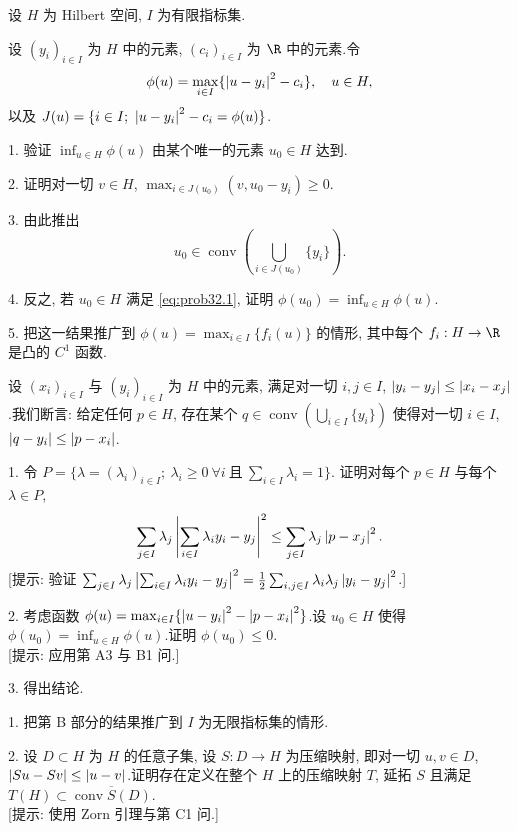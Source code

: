\begin{problem}
\label{prob:32}
设 $H$ 为 Hilbert 空间, $I$ 为有限指标集.


设 $(y_i)_{i\in I}$ 为 $H$ 中的元素, $(c_i)_{i\in I}$ 为 $\R$ 中的元素.令
\begin{equation*}
\phi(u)=\max_{i\in I}\{\left|u-y_i\right|^2-c_i\},\quad u\in H,
\end{equation*}
以及 $J(u)=\{i\in I;\ \abs{u-y_i}^2-c_i=\phi(u)\}$.

1. 验证 $\inf_{u\in H}\phi(u)$ 由某个唯一的元素 $u_0\in H$ 达到.

2. 证明对一切 $v\in H$, $\max_{i\in J(u_0)}(v,u_0-y_i)\ge0$.

3. 由此推出
\begin{equation}
u_0\in\operatorname{conv}\left(\bigcup_{i\in J(u_0)}\{y_i\}\right).
\label{eq:prob32.1}
\end{equation}

4. 反之, 若 $u_0\in H$ 满足 \eqref{eq:prob32.1}, 证明 $\phi(u_0)=\inf_{u\in H}\phi(u)$.

5. 把这一结果推广到 $\phi(u)=\max_{i\in I}\{f_i(u)\}$ 的情形, 其中每个 $f_i:H\to\R$
是凸的 $C^1$ 函数.


设 $(x_i)_{i\in I}$ 与 $(y_i)_{i\in I}$ 为 $H$ 中的元素, 满足对一切 $i,j\in I$,
$\left|y_i-y_j\right|\le\left|x_i-x_j\right|$.我们断言: 给定任何 $p\in H$, 存在某个
$q\in\operatorname{conv}\left(\bigcup_{i\in I}\{y_i\}\right)$ 使得对一切 $i\in I$,
$\left|q-y_i\right|\le\left|p-x_i\right|$.

1. 令 $P=\{\lambda=(\lambda_i)_{i\in I};\ \lambda_i\ge0\ \forall i\ \text{且}\ \sum_{i\in I}\lambda_i=1\}$.
证明对每个 $p\in H$ 与每个 $\lambda\in P$,
\begin{equation*}
\sum_{j\in I}\lambda_j\left|\sum_{i\in I}\lambda_iy_i-y_j\right|^2\le\sum_{j\in I}\lambda_j\left|p-x_j\right|^2.
\end{equation*}
[提示: 验证 $\sum_{j\in I}\lambda_j\left|\sum_{i\in I}\lambda_iy_i-y_j\right|^2=\frac12\sum_{i,j\in I}\lambda_i\lambda_j\left|y_i-y_j\right|^2$.]

2. 考虑函数 $\phi(u)=\max_{i\in I}\{\left|u-y_i\right|^2-\left|p-x_i\right|^2\}$.设 $u_0\in H$
使得 $\phi(u_0)=\inf_{u\in H}\phi(u)$.证明 $\phi(u_0)\le0$.\\
{[提示: 应用第 A3 与 B1 问.]}

3. 得出结论.


1. 把第 B 部分的结果推广到 $I$ 为无限指标集的情形.

2. 设 $D\subset H$ 为 $H$ 的任意子集, 设 $S:D\to H$ 为压缩映射, 即对一切 $u,v\in D$,
$\left|Su-Sv\right|\le\left|u-v\right|$.证明存在定义在整个 $H$ 上的压缩映射 $T$, 延拓 $S$ 且满足
$T(H)\subset\overline{\operatorname{conv}S(D)}$.\\
{[提示: 使用 Zorn 引理与第 C1 问.]}
\end{problem}

